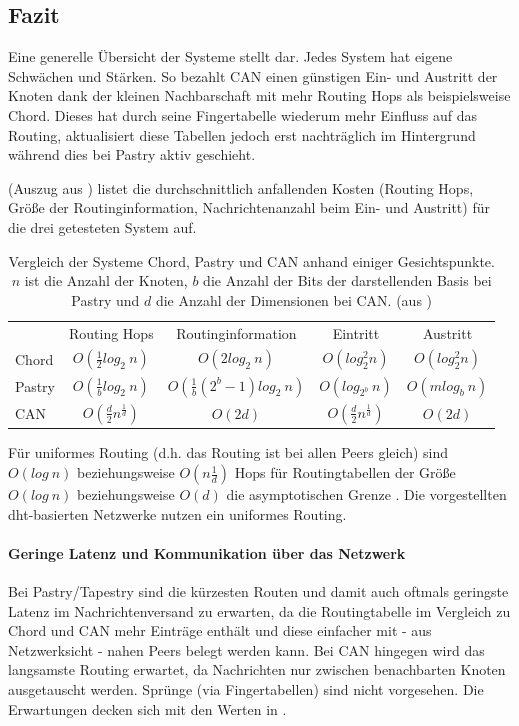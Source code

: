 \subsection*{Fazit}
Eine generelle Übersicht der Systeme stellt  dar. Jedes System hat eigene Schwächen und Stärken. So bezahlt CAN einen günstigen Ein- und Austritt der Knoten dank der kleinen Nachbarschaft mit mehr Routing Hops als beispielsweise Chord. Dieses hat durch seine Fingertabelle wiederum mehr Einfluss auf das Routing, aktualisiert diese Tabellen jedoch erst nachträglich im Hintergrund während dies bei Pastry aktiv geschieht.

 (Auszug aus \cite{Goetz2005}) listet die durchschnittlich anfallenden Kosten (Routing Hops, Größe der Routinginformation, Nachrichtenanzahl beim Ein- und Austritt) für die drei getesteten System auf.

\begin{table}[htbp]
\centering
\label{tab:evaluation_fazit}
\begin{tabular}{lcccc}
\toprule
 & Routing Hops & Routinginformation & Eintritt & Austritt\\ 
 \cmidrule{2-5}
Chord & $O(\frac{1}{2}log_2~n)$ & $O(2log_2~n) $ & $ O(log_2^2 n) $ & $ O(log_2^2 n) $ \\
Pastry & $O(\frac{1}{b}log_2~n)$ & $O(\frac{1}{b} (2^b-1) log_2~n) $ & $ O(log_{2^b}~n) $ & $ O(mlog_b~n) $ \\
CAN & $O(\frac{d}{2}n^\frac{1}{d})	$ & $O(2 d) $ & $ O(\frac{d}{2}n^\frac{1}{d}) $ & $ O(2 d) $ \\
\bottomrule
\end{tabular}
\caption{Vergleich der Systeme Chord, Pastry und CAN anhand einiger Gesichtspunkte. $n$ ist die Anzahl der Knoten, $b$ die Anzahl der Bits der darstellenden Basis bei Pastry und $d$ die Anzahl der Dimensionen bei CAN. (aus \cite{Goetz2005})}
\end{table}

Für uniformes Routing (d.h. das Routing ist bei allen Peers gleich) sind $O(log~n)$ beziehungsweise $O(n\frac{1}{d})$ Hops für Routingtabellen der Größe $O(log~n)$ beziehungsweise $O(d)$ die asymptotischen Grenze \cite{Xu2004Fundamental}. Die vorgestellten \ac{dht}-basierten Netzwerke nutzen ein uniformes Routing.


\paragraph{Geringe Latenz und Kommunikation über das Netzwerk}
Bei Pastry/Tapestry sind die kürzesten Routen und damit auch oftmals geringste Latenz im Nachrichtenversand zu erwarten, da die Routingtabelle im Vergleich zu Chord und CAN mehr Einträge enthält und diese einfacher mit - aus Netzwerksicht - nahen Peers belegt werden kann. Bei CAN hingegen wird das langsamste Routing erwartet, da Nachrichten nur zwischen benachbarten Knoten ausgetauscht werden. Sprünge (via Fingertabellen) sind nicht vorgesehen. Die Erwartungen decken sich mit den Werten in .

